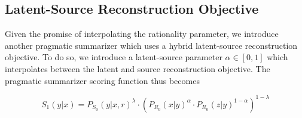 \documentclass[11pt]{article}
\begin{document}
\begin{table}
\begin{adjustwidth}{-2cm}{}
\centering
\caption{Frequencies for when the maximum ROUGE score is achieved by the pragmatic summarizer using either the source or latent reconstruction objective and either $\lambda = 0$, $\lambda \in (0,1)$ or $\lambda = 1$.}
\label{tab:battle_interpole}
\end{adjustwidth}
\end{table}

\subsection{Latent-Source Reconstruction Objective}

Given the promise of interpolating the rationality parameter, we introduce another pragmatic summarizer which uses a hybrid latent-source reconstruction objective. To do so, we introduce a latent-source parameter $\alpha \in [0,1]$ which interpolates between the latent and source reconstruction objective. The pragmatic summarizer scoring function thus becomes
\begin{adjustwidth}{-2cm}{}
\begin{equation}
    S_1(y|x) = P_{S_0}(y|x,r)^\lambda \cdot \left ( P_{R_0}(x|y)^\alpha \cdot P_{R_0}(z|y)^{1 - \alpha}\right )^{1 - \lambda}
\end{equation}
\end{adjustwidth}
\end{document}
